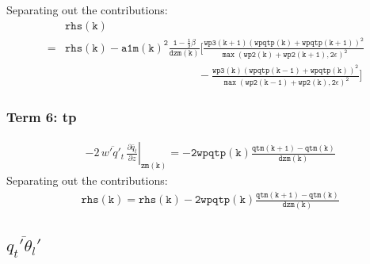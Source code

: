 \documentclass[11pt,fleqn]{article}
\newcommand{\ptlder}[2]{\frac{\partial #1}{\partial #2}}
\begin{document}
%
Separating out the contributions:
%
\begin{equation}
\begin{split}
&\mathtt{rhs(k)} \\
=& \mathtt{
   rhs(k)
   - a1m(k)^{2}\frac{1 - \frac{1}{3}\beta}{dzm(k)}
     \bigg[ \frac{wp3(k+1) \left(wpqtp(k)+wpqtp(k+1)\right)^2}
                 {\max\left(wp2(k)+wp2(k+1),2\epsilon\right)^2} } \\
 & \mathtt{ \quad \quad \quad \quad \qquad \qquad \qquad \qquad
           -\frac{wp3(k) \left(wpqtp(k-1)+wpqtp(k)\right)^2}
                 {\max\left(wp2(k-1)+wp2(k),2\epsilon\right)^2}
     \bigg]
   }
\end{split}
\end{equation}

\subsubsection{Term 6:  tp}

\begin{equation}
\begin{split}
&\left. - 2 \, \overline{w'q'_t} \, \ptlder{\bar{q}_t}{z} \right|_{\mathtt{zm(k)}}
 = \mathtt{ - 2 wpqtp(k) \frac{qtm(k+1)-qtm(k)}{dzm(k)} }
\end{split}
\end{equation}
%
Separating out the contributions:
%
\begin{equation}
\begin{split}
&\mathtt{rhs(k) = rhs(k) - 2 wpqtp(k) \frac{qtm(k+1)-qtm(k)}{dzm(k)} }
\end{split}
\end{equation}

\subsection{ $\overline{q_t'\theta_l'}$  }
\end{document}
